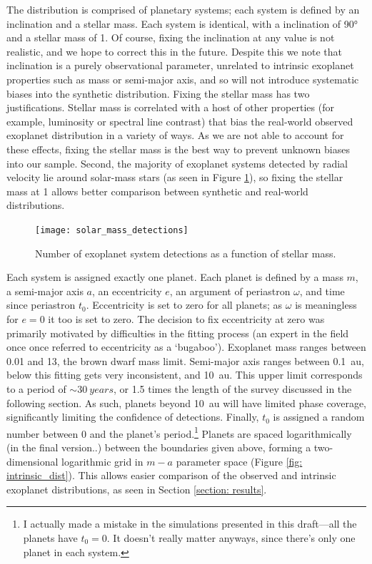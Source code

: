 \documentclass[12pt,manuscript]{aastex}
\begin{document}
The distribution is comprised of planetary systems; each system is defined by an inclination and a stellar mass. 
Each system is identical, with a inclination of \ang{90} and a stellar mass of \SI{1}{\Msun}.
Of course, fixing the inclination at any value is not realistic, and we hope to correct this in the future. 
Despite this we note that inclination is a purely observational parameter, unrelated to intrinsic exoplanet properties such as mass or semi-major axis, and so will not introduce systematic biases into the synthetic distribution.
Fixing the stellar mass has two justifications.
Stellar mass is correlated with a host of other properties (for example, luminosity or spectral line contrast) that bias the real-world observed exoplanet distribution in a variety of ways. 
As we are not able to account for these effects, fixing the stellar mass is the best way to prevent unknown biases into our sample. 
Second, the majority of exoplanet systems detected by radial velocity lie around solar-mass stars (as seen in Figure \ref{fig: solar mass}), so fixing the stellar mass at \SI{1}{\Msun} allows better comparison between synthetic and real-world distributions.

\begin{figure}[h]
  \centering
  \texttt{[image: solar\_mass\_detections]}
  \caption{Number of exoplanet system detections as a function of stellar mass.}
  \label{fig: solar mass}
\end{figure}

Each system is assigned exactly one planet. 
Each planet is defined by a mass $m$, a semi-major axis $a$, an eccentricity $e$, an argument of periastron $\omega$, and time since periastron $t_0$. 
Eccentricity is set to zero for all planets; as $\omega$ is meaningless for $e=0$ it too is set to zero. 
The decision to fix eccentricity at zero was primarily motivated by difficulties in the fitting process (an expert in the field once once referred to eccentricity as a `bugaboo'). 
Exoplanet mass ranges between \SI{0.01}{\Mearth} and \SI{13}{\Mjup}, the brown dwarf mass limit. 
Semi-major axis ranges between \SI{0.1}{au}, below this fitting gets very inconsistent, and \SI{10}{au}. 
This upper limit corresponds to a period of $\sim \SI{30}{years}$, or 1.5 times the length of the survey discussed in the following section. 
As such, planets beyond \SI{10}{au} will have limited phase coverage, significantly limiting the confidence of detections.
Finally, $t_0$ is assigned a random number between 0 and the planet's period.\footnote{I actually made a mistake in the simulations presented in this draft---all the planets have $t_0=0$. It doesn't really matter anyways, since there's only one planet in each system.}
Planets are spaced logarithmically (in the final version..) between the boundaries given above, forming a two-dimensional logarithmic grid in $m-a$ parameter space (Figure \ref{fig: intrinsic_dist}). This allows easier comparison of the observed and intrinsic exoplanet distributions, as seen in Section \ref{section: results}.
\end{document}
